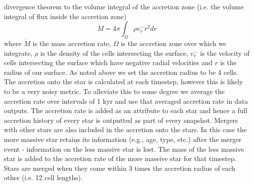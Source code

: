 \documentclass[graphics, twocolumn, usenatbib]{mn2e}
\begin{document}
divergence theorem to the volume integral of the accretion zone \citep[e.g][]{Bleuler_2014}
(i.e. the volume integral of flux inside the accretion zone)
\begin{equation}
  \dot{M} = 4\pi \int_\Omega { \rho v_r^- r^2 dr}
\end{equation}
where $\dot{M}$ is the mass accretion rate, $\Omega$ is the accretion zone over which we integrate,
$\rho$ is the
density of the cells intersecting the surface, $v_r^-$ is the velocity of cells intersecting
the surface which have negative radial velocities and $r$ is the radius of our surface. As noted above we
set the accretion radius to be 4 cells. The accretion onto the star is calculated at each timestep,
however this is likely to be a very noisy metric. To alleviate this to some degree we average
the accretion rate over intervals of 1 kyr and use that averaged accretion rate in data outputs. The accretion rate is added as an attribute to each star and hence a full
accretion history of every star is outputted as part of every snapshot. Mergers with other stars
are also included in the accretion onto the stars. In this case the more massive star retains its
information (e.g., age, type, etc.) after the merger event - information on the less massive star is
lost. The mass of the less massive star is added to the accretion rate of the more massive star for
that timestep. Stars are merged when they come within 3 times the accretion radius of each other (i.e. 12 cell lengths).\\
\end{document}
